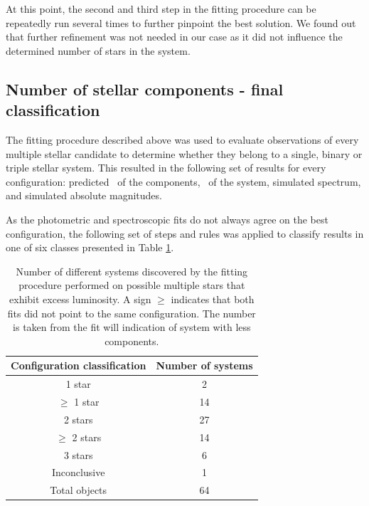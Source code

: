 At this point, the second and third step in the fitting procedure can be repeatedly run several times to further pinpoint the best solution. We found out that further refinement was not needed in our case as it did not influence the determined number of stars in the system.


\subsection{Number of stellar components - final classification}
\label{sec:number_stars_tripple}
The fitting procedure described above was used to evaluate observations of every multiple stellar candidate to determine whether they belong to a single, binary or triple stellar system. This resulted in the following set of results for every configuration: predicted \Teff\ of the components, \Feh\ of the system, simulated spectrum, and simulated absolute magnitudes.

As the photometric and spectroscopic fits do not always agree on the best configuration, the following set of steps and rules was applied to classify results in one of six classes presented in Table \ref{tab:res_multiples}.

\begin{table}
	\centering
	\caption{Number of different systems discovered by the fitting procedure performed on possible multiple stars that exhibit excess luminosity. A sign $\geq$ indicates that both fits did not point to the same configuration. The number is taken from the fit will indication of system with less components.}
	\begin{tabular}{c c}
		\hline
		Configuration classification & Number of systems \\ 
		\hline \hline
		1 star & 2 \\
		$\geq$ 1 star & 14 \\
		2 stars & 27 \\
		$\geq$ 2 stars & 14 \\
		3 stars & 6 \\
		Inconclusive & 1 \\
		\hline
		Total objects & 64 \\
		\hline
	\end{tabular}
	\label{tab:res_multiples}
\end{table}


